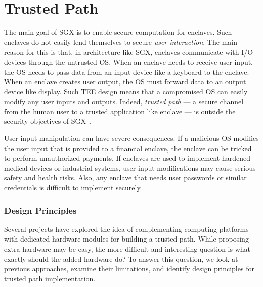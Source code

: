 
\section*{Trusted Path}

The main goal of SGX is to enable secure computation for enclaves. Such enclaves do not easily lend themselves to secure \emph{user interaction}. The main reason for this is that, in architecture like SGX, enclaves communicate with I/O devices through the untrusted OS. When an enclave needs to receive user input, the OS needs to pass data from an input device like a keyboard to the enclave. When an enclave creates user output, the OS must forward data to an output device like display. Such TEE design means that a compromised OS can easily modify any user inputs and outputs.
Indeed, \emph{trusted path} --- a secure channel from the human user to a trusted application like enclave --- is outside the security objectives of SGX~\cite{mckeen2013}. 

User input manipulation can have severe consequences. If a malicious OS modifies the user input that is provided to a financial enclave, the enclave can be tricked to perform unauthorized payments. If enclaves are used to implement hardened medical devices or industrial systems, user input modifications may cause serious safety and health risks. Also, any enclave that needs user passwords or similar credentials is difficult to implement securely.




\subsubsection*{Design Principles}

Several projects have explored the idea of complementing computing platforms with dedicated hardware modules for building a trusted path. While proposing extra hardware may be easy, the more difficult and interesting question is what exactly should the added hardware do? To answer this question, we look at previous approaches, examine their limitations, and identify design principles for trusted path implementation.
    
